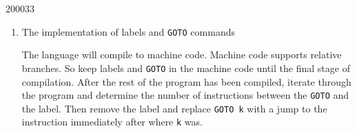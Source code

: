 \documentclass[10pt,\jkfside,a4paper]{article}
\begin{document}
\begin{examquestion}{2000}{3}{3}
\begin{enumerate}
\item The implementation of labels and \texttt{GOTO} commands

The language will compile to machine code. Machine code supports relative
branches. So keep labels and \texttt{GOTO} in the machine code until the
final stage of compilation. After the rest of the program has been compiled,
iterate through the program and determine the number of instructions between
the \texttt{GOTO} and the label. Then remove the label and replace
\texttt{GOTO k} with a jump to the instruction immediately after where
\texttt{k} was.

\end{enumerate}

\end{examquestion}
\end{document}
